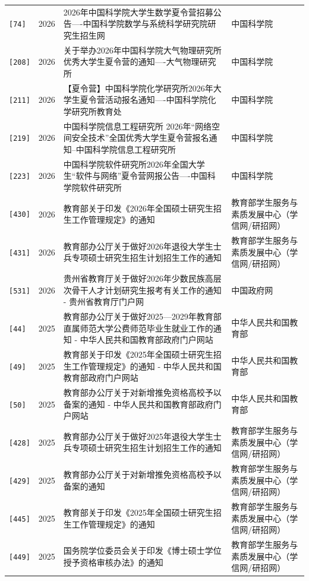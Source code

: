 {\begin{longtable}{p{1.6cm}p{1.1cm}p{6.0cm}p{7.3cm}}
{\texttt{[74]}} & 2026 & 2026年中国科学院大学生数学夏令营招募公告----中国科学院数学与系统科学研究院研究生招生网 & 中国科学院 \\
{\texttt{[208]}} & 2026 & 关于举办2026年中国科学院大气物理研究所优秀大学生夏令营的通知----大气物理研究所 & 中国科学院 \\
{\texttt{[211]}} & 2026 & 【夏令营】中国科学院化学研究所2026年大学生夏令营活动报名通知----中国科学院化学研究所教育处 & 中国科学院 \\
{\texttt{[219]}} & 2026 & 中国科学院信息工程研究所 2026年“网络空间安全技术”全国优秀大学生夏令营报名通知--中国科学院信息工程研究所 & 中国科学院 \\
{\texttt{[223]}} & 2026 & 中国科学院软件研究所2026年全国大学生“软件与网络”夏令营网报公告----中国科学院软件研究所 & 中国科学院 \\
{\texttt{[430]}} & 2026 & 教育部关于印发《2026年全国硕士研究生招生工作管理规定》的通知 & 教育部学生服务与素质发展中心（学信网/研招网） \\
{\texttt{[431]}} & 2026 & 教育部办公厅关于做好2026年退役大学生士兵专项硕士研究生招生计划招生工作的通知 & 教育部学生服务与素质发展中心（学信网/研招网） \\
{\texttt{[531]}} & 2026 & 贵州省教育厅关于做好2026年少数民族高层次骨干人才计划研究生报考有关工作的通知 - 贵州省教育厅门户网 & 中国政府网 \\
{\texttt{[44]}} & 2025 & 教育部办公厅关于做好2025—2029年教育部直属师范大学公费师范毕业生就业工作的通知 - 中华人民共和国教育部政府门户网站 & 中华人民共和国教育部 \\
{\texttt{[49]}} & 2025 & 教育部关于印发《2025年全国硕士研究生招生工作管理规定》的通知 - 中华人民共和国教育部政府门户网站 & 中华人民共和国教育部 \\
{\texttt{[50]}} & 2025 & 教育部办公厅关于对新增推免资格高校予以备案的通知 - 中华人民共和国教育部政府门户网站 & 中华人民共和国教育部 \\
{\texttt{[428]}} & 2025 & 教育部办公厅关于做好2025年退役大学生士兵专项硕士研究生招生计划招生工作的通知 & 教育部学生服务与素质发展中心（学信网/研招网） \\
{\texttt{[429]}} & 2025 & 教育部办公厅关于对新增推免资格高校予以备案的通知 & 教育部学生服务与素质发展中心（学信网/研招网） \\
{\texttt{[445]}} & 2025 & 教育部关于印发《2025年全国硕士研究生招生工作管理规定》的通知 & 教育部学生服务与素质发展中心（学信网/研招网） \\
{\texttt{[449]}} & 2025 & 国务院学位委员会关于印发《博士硕士学位授予资格审核办法》的通知 & 教育部学生服务与素质发展中心（学信网/研招网） \\

\end{longtable}}
